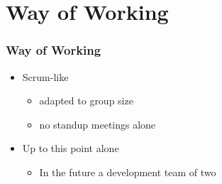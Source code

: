 \section{Way of Working}
\begin{frame}\frametitle{Way of Working}
	\begin{itemize}
		\item Scrum-like
		\begin{itemize}
			\item adapted to group size
			\item no standup meetings alone
		\end{itemize}
		\item Up to this point alone
		\begin{itemize}
			\item In the future a development team of two
		\end{itemize}
	\end{itemize}
\end{frame}